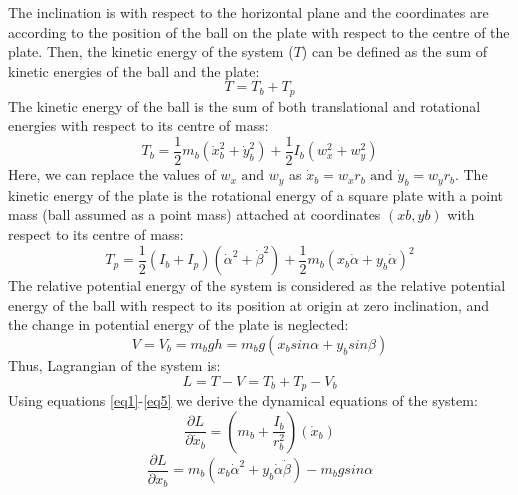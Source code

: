 \documentclass[conference]{IEEEtran}
\begin{document}
The inclination is with respect to the horizontal plane and the coordinates are according to the position of the ball on the plate with respect to the centre of the plate.
Then, the kinetic energy of the system ($T$) can be defined as the sum of kinetic energies of the ball and the plate: 
\begin{equation}
T = T_{b} + T_{p}\label{eq2}
\end{equation}
The kinetic energy of the ball is the sum of both translational and rotational energies with respect to its centre of mass:
\begin{equation}
T_{b} = \frac{1}{2} m_{b} \left( \dot x_{b}^{2} + \dot y_{b}^{2} \right) +  \frac{1}{2} I_{b} \left(w_{x}^{2} + w_{y}^{2} \right)\label{eq3}
\end{equation}
Here, we can replace the values of $w_{x} \mbox{ and } w_{y}$ as $ \dot x_{b} \! = \! w_{x}r_{b} \mbox{ and } \dot y_{b} \! = \! w_{y}r_{b}$.
The kinetic energy of the plate is the rotational energy of a square plate with a point mass (ball assumed as a point mass) attached at coordinates $(xb, yb)$ with respect to its centre of mass:
\begin{equation}
T_{p} = \frac{1}{2} \left(I_{b} + I_{p}\right) (\dot \alpha^{2} + \dot \beta^{2} ) + \frac{1}{2} m_{b} ( x_{b} \dot \alpha + y_{b}\dot \alpha )^{2}\label{eq4}
\end{equation}
The relative potential energy of the system is considered as the relative potential energy of the ball with respect to its position at origin at zero inclination, and the change in potential energy of the plate is neglected:
\begin{equation}
V = V_{b} = m_{b} g h = m_{b} g \left( x_{b}sin\alpha + y_{b}sin\beta\right)\label{eq5}
\end{equation}
Thus, Lagrangian of the system is:
\begin{equation}
L = T - V = T_{b} + T_{p} - V_{b}\label{eq6}
\end{equation}
Using equations \ref{eq1}-\ref{eq5} we derive the dynamical equations of the system: 
\begin{equation}
\frac{\partial L}{\partial \dot x_{b}} =  \left( m_{b} + \frac{I_{b}}{r_{b}^{2}} \right) (\dot x_{b})
\label{eq7}\end{equation}
\begin{equation}
\frac{\partial L}{\partial x_{b}} = m_{b}(x_{b}\dot\alpha^{2} + y_{b}\dot\alpha\dot\beta) - m_{b}gsin\alpha
\label{eq8}\end{equation}
\end{document}
